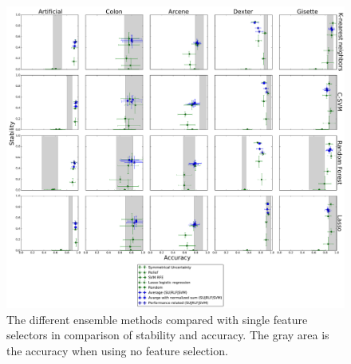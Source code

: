 \documentclass[twoside,11pt]{article}
\begin{document}
\begin{figure}[h!]
  \centering
    \includegraphics[width=\textwidth]{images/boxplots.pdf}
  \caption{The different ensemble methods compared with single feature selectors in comparison of stability and accuracy.
  The gray area is the accuracy when using no feature selection.}
  \label{fig:boxplots}
\end{figure}
\end{document}
